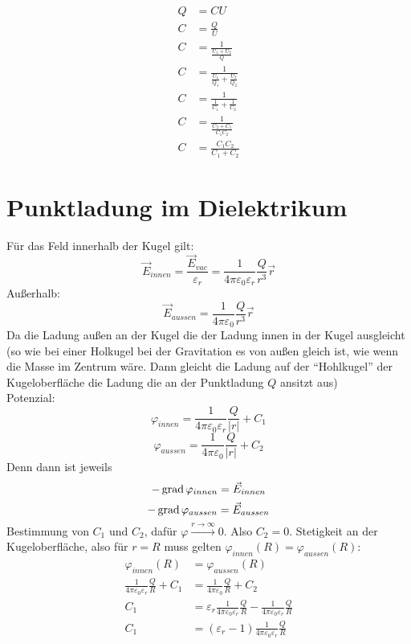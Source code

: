 \documentclass[sectionformat=aufgabe]{gadsescript}
\begin{document}
\begin{enumerate}[label=\alph*)]
\begin{align*}
		\end{align*}
		\begin{align*}
			Q &= CU \\
			C &= \frac{ Q }{ U }  \\
			C &= \frac{ 1 }{ \frac{ U_1 + U_2 }{ Q } } \\
			C &= \frac{ 1 }{ \frac{ U_1 }{ Q_1 } + \frac{ U_2 }{ Q_2 } } \\
			C &= \frac{ 1 }{ \frac{ 1 }{ C_1 } + \frac{ 1 }{ C_2 } } \\
			C &= \frac{ 1 }{ \frac{ C_2 + C_1 }{ C_1C_2 } } \\
			C &= \frac{ C_1C_2 }{ C_1 + C_2 }
		\end{align*}
		
\end{enumerate}

\section{Punktladung im Dielektrikum}
Für das Feld innerhalb der Kugel gilt:
\[
	\vec E_{innen } = \frac{ \vec E_{vac} }{ \varepsilon _r } = \frac{ 1 }{ 4 \pi  \varepsilon _0 \varepsilon _r } \frac{ Q }{ r^3 } \vec r
\]
Außerhalb:
\[
	\vec E_{aussen} = \frac{ 1 }{ 4 \pi \varepsilon _0 } \frac{ Q }{ r^3 } \vec r
\]
Da die Ladung außen an der Kugel die der Ladung innen in der Kugel ausgleicht (so wie bei einer  Holkugel bei der Gravitation es von außen gleich ist, wie wenn die Masse im Zentrum wäre. Dann gleicht die Ladung auf der ``Hohlkugel'' der Kugeloberfläche die Ladung die an der Punktladung $ Q $ ansitzt aus)\\
Potenzial:
\[
	\varphi_{innen}  = \frac{ 1 }{ 4 \pi \varepsilon _0 \varepsilon _r } \frac{ Q }{ \left| r \right|  } + C_1
\]
\[
	\varphi_{aussen}  = \frac{ 1 }{ 4 \pi \varepsilon _0 } \frac{ Q }{ \left| r \right|  } + C_2
\]
Denn dann ist jeweils
\[
	-\operatorname{grad} \varphi_{innen} = \vec E_{innen} 
\]
\[
	-\operatorname{grad} \varphi_{aussen} = \vec E_{aussen} 
\]
Bestimmung von $ C_1 $ und $ C_2 $, dafür $ \varphi \overset{r \to \infty}{\longrightarrow} 0 $.
Also $ C_2 = 0 $.
Stetigkeit an der Kugeloberfläche, also für $ r = R $ muss gelten $ \varphi_{innen} (R) = \varphi_{aussen} (R) $:
\begin{align*}
	\varphi_{innen} (R) &=  \varphi_{aussen} (R) \\
	\frac{ 1 }{ 4 \pi  \varepsilon _0 \varepsilon_r } \frac{ Q }{ R } + C_1 &= \frac{ 1 }{ 4 \pi  \varepsilon _0 } \frac{ Q }{ R } + C_2 \\
	C_1 &= \varepsilon _r \frac{ 1 }{ 4 \pi \varepsilon _0 \varepsilon _r } \frac{ Q }{ R } - \frac{ 1 }{ 4 \pi \varepsilon _0 \varepsilon _r } \frac{ Q }{ R } \\
	C_1 &= (\varepsilon _r - 1) \frac{ 1 }{ 4 \pi  \varepsilon _0 \varepsilon _r } \frac{ Q }{ R }  \\
\end{align*}
\end{document}
